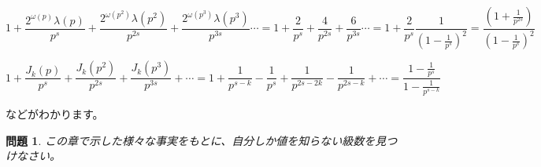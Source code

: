 \documentclass[./main]{subfiles}
\theoremstyle{break}
\newtheorem*{prb}{問題}
\begin{document}
\[1+\frac{2^{\omega(p)}\lambda(p)}{p^s}+\frac{2^{\omega(p^2)}\lambda(p^2)}{p^{2s}}+\frac{2^{\omega(p^3)}\lambda(p^3)}{p^{3s}}\cdots=1+\frac{2}{p^s}+\frac{4}{p^{2s}}+\frac{6}{p^{3s}}\cdots=1+\frac{2}{p^s}\frac{1}{\left( 1-\frac{1}{p^s} \right)^2}=\frac{\left( 1+\frac{1}{p^{2s}} \right)}{\left( 1-\frac{1}{p^s} \right)^2}\]

\[1+\frac{J_k(p)}{p^s}+\frac{J_k(p^2)}{p^{2s}}+\frac{J_k(p^3)}{p^{3s}}+\cdots=1+\frac{1}{p^{s-k}}-\frac{1}{p^s}+\frac{1}{p^{2s-2k}}-\frac{1}{p^{2s-k}}+\cdots=\frac{1-\frac{1}{p^s}}{1-\frac{1}{p^{s-k}}}\]

などがわかります。

\begin{prb}
この章で示した様々な事実をもとに、自分しか値を知らない級数を見つけなさい。
\end{prb}
\end{document}

